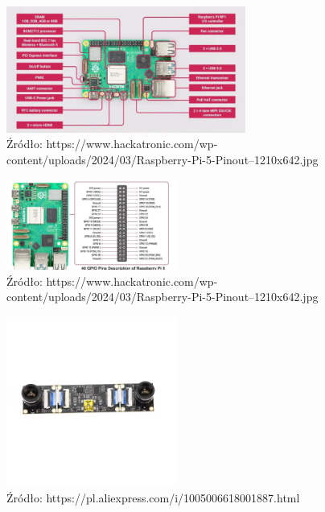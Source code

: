 \documentclass[magisterska]{pracadypl}
\begin{document}
\begin{figure}[h]  %
    \centering  %
    \includegraphics[width=0.7\textwidth]{images/RPI-SPEC.jpg}  %
    \captionsetup{labelformat=empty, font=footnotesize}
    \caption{Źródło: https://www.hackatronic.com/wp-content/uploads/2024/03/Raspberry-Pi-5-Pinout--1210x642.jpg}
    \label{fig:rpi-spec}  %
\end{figure}

\begin{figure}[h]  %
    \centering  %
    \includegraphics[width=0.5\textwidth]{images/RPI-PIN.jpg}  %
    \captionsetup{labelformat=empty, font=footnotesize}
    \caption{Źródło: https://www.hackatronic.com/wp-content/uploads/2024/03/Raspberry-Pi-5-Pinout--1210x642.jpg}
    \label{fig:rpi-gpio}  %
\end{figure}

\begin{figure}[h]  %
    \centering  %
    \includegraphics[width=0.5\textwidth]{images/MAINSTEREO.png}  %
    \captionsetup{labelformat=empty, font=footnotesize}
    \caption{Źródło: https://pl.aliexpress.com/i/1005006618001887.html}
    \label{fig:mono}  %
\end{figure}
\end{document}
